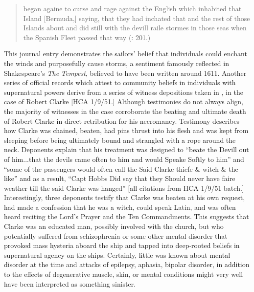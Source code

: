 \begin{quotation}
began againe to curse and rage against the English which inhabited that Island [Bermuda,] saying, that they had inchated that and the rest of those Islands about and did still with the devill raile stormes in those seas when the Spanish Fleet passed that way (\citealt{Gage1648}: 201.) \end{quotation}

This journal entry demonstrates the sailors’ belief that individuals could enchant the winds and purposefully cause storms, a sentiment famously reflected in Shakespeare’s \textit{The} \textit{Tempest}, believed to have been written around 1611. Another series of official records which attest to community beliefs in individuals with supernatural powers derive from a series of witness depositions taken in \citealt{Virginia1661}, in the case of Robert Clarke [HCA 1/9/51.] Although testimonies do not always align, the majority of witnesses in the case corroborate the beating and ultimate death of Robert Clarke in direct retribution for his necromancy. Testimony describes how Clarke was chained, beaten, had pins thrust into his flesh and was kept from sleeping before being ultimately bound and strangled with a rope around the neck. Deponents explain that his treatment was designed to “beate the Devill out of him...that the devils came often to him and would Speake Softly to him” and “some of the passengers would often call the Said Clarke thiefe \& witch \& the like” and as a result, “Capt Hobbs Did say that they Should never have faire weather till the said Clarke was hanged” [all citations from HCA 1/9/51 batch.] Interestingly, three deponents testify that Clarke was beaten at his own request, had made a confession that he was a witch, could speak Latin, and was often heard reciting the Lord’s Prayer and the Ten Commandments. This suggests that Clarke was an educated man, possibly involved with the church, but who potentially suffered from schizophrenia or some other mental disorder that provoked mass hysteria aboard the ship and tapped into deep-rooted beliefs in supernatural agency on the ships. Certainly, little was known about mental disorder at the time and attacks of epilepsy, aphasia, bipolar disorder, in addition to the effects of degenerative muscle, skin, or mental conditions might very well have been interpreted as something sinister. 

